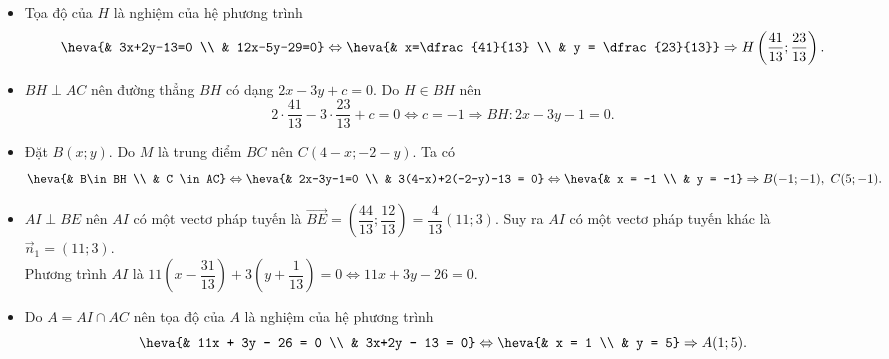 \begin{bt}
{\begin{itemize}
				$\Rightarrow EM$ có một vectơ pháp tuyến $\overrightarrow{n}=(12;-5)$. Phương trình $EM$ là \[ 12(x-2)-5(y+1)=0 \Leftrightarrow 12x-5y-29=0.\]
				\item Tọa độ của $H$ là nghiệm của hệ phương trình \[\heva{& 3x+2y-13=0 \\ & 12x-5y-29=0} \Leftrightarrow \heva{& x=\dfrac{41}{13} \\ & y = \dfrac{23}{13}} \Rightarrow H\left(\dfrac{41}{13};\dfrac{23}{13}\right).\]
				\item $BH\perp AC$ nên đường thẳng $BH$ có dạng $2x-3y+c=0$. Do $H\in BH$ nên
				\[ 2\cdot \dfrac{41}{13} - 3\cdot \dfrac{23}{13} + c = 0 \Leftrightarrow c=-1 \Rightarrow BH \colon 2x-3y-1=0.\]
				\item Đặt $B(x;y)$. Do $M$ là trung điểm $BC$ nên $C(4-x; -2-y)$. Ta có
				\[ \heva{& B\in BH \\ & C \in AC}\Leftrightarrow \heva{& 2x-3y-1=0 \\ & 3(4-x)+2(-2-y)-13 = 0} \Leftrightarrow \heva{& x = -1 \\ & y = -1} \Rightarrow B(-1;-1), \ C(5;-1).\]
				\item $AI \perp BE$ nên $AI$ có một vectơ pháp tuyến là $\overrightarrow{BE}=\left(\dfrac{44}{13}; \dfrac{12}{13}\right) = \dfrac{4}{13} (11;3)$. Suy ra $AI$ có một vectơ pháp tuyến khác là $\overrightarrow{n}_1=(11;3)$.\\
				Phương trình $AI$ là $11  \left( x  - \dfrac{31}{13} \right) + 3  \left( y + \dfrac{1}{13}\right) = 0 \Leftrightarrow 11x + 3y -26=0$.
				\item Do $A=AI \cap AC$ nên tọa độ của $A$ là nghiệm của hệ phương trình
				\[ \heva{& 11x + 3y - 26 = 0 \\ & 3x+2y - 13 = 0} \Leftrightarrow \heva{& x = 1 \\ & y = 5} \Rightarrow A(1;5).\]
			\end{itemize}
		}
	\end{bt}
